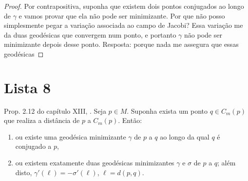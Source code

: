 \begin{proof}
Por contrapositiva, suponha que existem dois pontos conjugados
 ao longo de $\gamma$ e vamos provar que ela não pode ser minimizante. 
Por que não posso simplesmente pegar a variação associada ao campo de 
Jacobi? Essa variação me da duas geodésicas que convergem num ponto,
 e portanto $\gamma$ não pode ser minimizante depois desse ponto. 
Resposta: porque nada me assegura que essas geodésicas 
\end{proof}

\section{Lista 8}
\label{section-lista-8}

\begin{exercise}
\label{exercise-l8-1}
Prop. 2.12 do capítulo XIII, \cite{doc}. Seja $p \in M$. 
Suponha exista um ponto $q \in C_m(p)$ que realiza a distância de $p$ a 
$C_m(p)$. Então:
\begin{enumerate}
\item ou existe uma geodésica 
minimizante $\gamma$ de $p$ a $q$ ao longo da qual $q$ é 
conjugado a $p$,
\item ou existem exatamente duas geodésicas 
minimizantes $\gamma$ e $\sigma$ de $p$ a $q$; além disto,
$\gamma'(\ell)=-\sigma'(\ell)$, 
$\ell=d(p,q)$. 
\end{enumerate}
\end{exercise}

